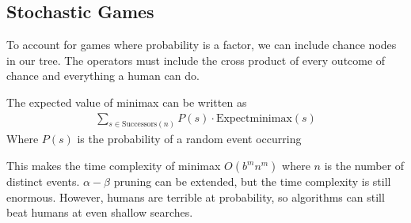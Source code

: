 \documentclass{chezarticle}
\begin{document}
\subsection{Stochastic Games}
To account for games where probability is a factor, we can include chance nodes in our tree. The operators must include the cross product of every outcome of chance and everything a human can do.
\begin{definition}
The expected value of minimax can be written as
\begin{align*}
    \sum_{s \in \text{Successors}(n)} P(s) \cdot \text{Expectminimax}(s)
\end{align*}
Where $P(s)$ is the probability of a random event occurring
\end{definition}
This makes the time complexity of minimax $O(b^m n^m)$ where $n$ is the number of distinct events. $\alpha - \beta$ pruning can be extended, but the time complexity is still enormous. However, humans are terrible at probability, so algorithms can still beat humans at even shallow searches.
\end{document}
